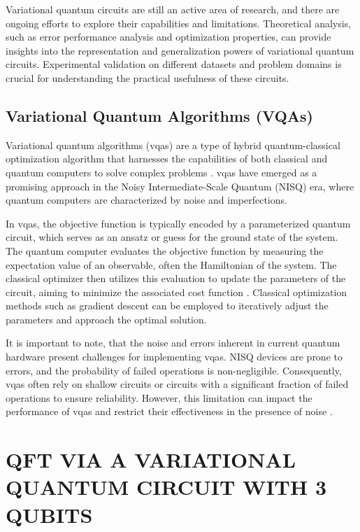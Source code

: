 \documentclass[inscr,ack,preface]{diphdthesis}
\begin{document}
Variational quantum circuits are still an active area of research, and there are ongoing efforts to explore their capabilities and limitations. Theoretical analysis, such as error performance analysis and optimization properties, can provide insights into the representation and generalization powers of variational quantum circuits. Experimental validation on different datasets and problem domains is crucial for understanding the practical usefulness of these circuits.

\section{Variational Quantum Algorithms (VQAs)}

Variational quantum algorithms (\acrshort{vqa}s) are a type of hybrid quantum-classical optimization algorithm that harnesses the capabilities of both classical and quantum computers to solve complex problems \cite{vqa}. \acrshort{vqa}s have emerged as a promising approach in the Noisy Intermediate-Scale Quantum (NISQ) era, where quantum computers are characterized by noise and imperfections.

In \acrshort{vqa}s, the objective function is typically encoded by a parameterized quantum circuit, which serves as an ansatz or guess for the ground state of the system. The quantum computer evaluates the objective function by measuring the expectation value of an observable, often the Hamiltonian of the system. The classical optimizer then utilizes this evaluation to update the parameters of the circuit, aiming to minimize the associated cost function \cite{vqa}. Classical optimization methods such as gradient descent can be employed to iteratively adjust the parameters and approach the optimal solution.

It is important to note, that the noise and errors inherent in current quantum hardware present challenges for implementing \acrshort{vqa}s. NISQ devices are prone to errors, and the probability of failed operations is non-negligible. Consequently, \acrshort{vqa}s often rely on shallow circuits or circuits with a significant fraction of failed operations to ensure reliability. However, this limitation can impact the performance of \acrshort{vqa}s and restrict their effectiveness in the presence of noise \cite{limitations}.

\chapter{QFT VIA A VARIATIONAL QUANTUM CIRCUIT WITH 3 QUBITS}
\end{document}
